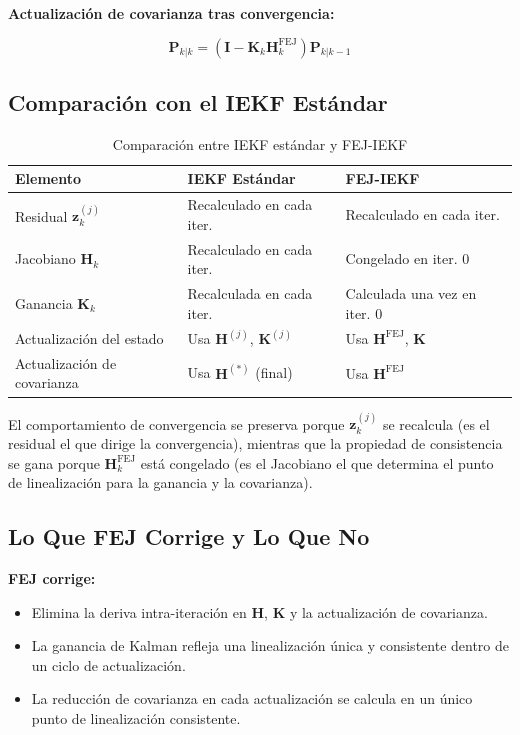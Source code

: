 \textbf{Actualización de covarianza tras convergencia:}

\begin{equation}
\mathbf{P}_{k|k} = (\mathbf{I} - \mathbf{K}_k \mathbf{H}_k^{\text{FEJ}}) \mathbf{P}_{k|k-1}
\label{eq:cov-update-fej}
\end{equation}

\subsection{Comparación con el IEKF Estándar}
\label{sec:fej-comparacion}

\begin{table}[t]
\centering
\caption{Comparación entre IEKF estándar y FEJ-IEKF}
\label{tab:iekf-fej-comparison}
\begin{tabular}{lll}
\hline
\textbf{Elemento} & \textbf{IEKF Estándar} & \textbf{FEJ-IEKF} \\
\hline
Residual $\mathbf{z}_k^{(j)}$ & Recalculado en cada iter. & Recalculado en cada iter. \\
Jacobiano $\mathbf{H}_k$ & Recalculado en cada iter. & Congelado en iter. 0 \\
Ganancia $\mathbf{K}_k$ & Recalculada en cada iter. & Calculada una vez en iter. 0 \\
Actualización del estado & Usa $\mathbf{H}^{(j)}$, $\mathbf{K}^{(j)}$ & Usa $\mathbf{H}^{\text{FEJ}}$, $\mathbf{K}$ \\
Actualización de covarianza & Usa $\mathbf{H}^{(*)}$ (final) & Usa $\mathbf{H}^{\text{FEJ}}$ \\
\hline
\end{tabular}
\end{table}

El comportamiento de convergencia se preserva porque $\mathbf{z}_k^{(j)}$ se
recalcula (es el residual el que dirige la convergencia), mientras que la
propiedad de consistencia se gana porque $\mathbf{H}_k^{\text{FEJ}}$ está
congelado (es el Jacobiano el que determina el punto de linealización para la
ganancia y la covarianza).

\subsection{Lo Que FEJ Corrige y Lo Que No}
\label{sec:fej-alcance-correccion}

\textbf{FEJ corrige:}

\begin{itemize}
    \item Elimina la deriva intra-iteración en $\mathbf{H}$, $\mathbf{K}$ y la
    actualización de covarianza.
    \item La ganancia de Kalman refleja una linealización única y consistente
    dentro de un ciclo de actualización.
    \item La reducción de covarianza en cada actualización se calcula en un
    único punto de linealización consistente.
\end{itemize}

